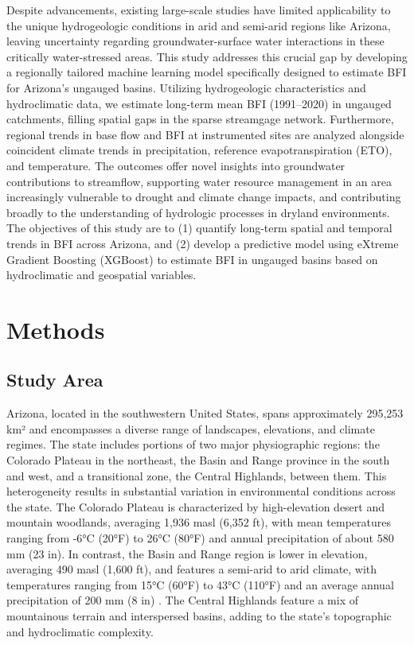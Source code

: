 \documentclass[
  authoryear,
  preprint,
  1p,
  onecolumn]{elsarticle}
\begin{document}
Despite advancements, existing large-scale studies have limited
applicability to the unique hydrogeologic conditions in arid and
semi-arid regions like Arizona, leaving uncertainty regarding
groundwater-surface water interactions in these critically
water-stressed areas. This study addresses this crucial gap by
developing a regionally tailored machine learning model specifically
designed to estimate BFI for Arizona's ungauged basins. Utilizing
hydrogeologic characteristics and hydroclimatic data, we estimate
long-term mean BFI (1991--2020) in ungauged catchments, filling spatial
gaps in the sparse streamgage network. Furthermore, regional trends in
base flow and BFI at instrumented sites are analyzed alongside
coincident climate trends in precipitation, reference evapotranspiration
(ETO), and temperature. The outcomes offer novel insights into
groundwater contributions to streamflow, supporting water resource
management in an area increasingly vulnerable to drought and climate
change impacts, and contributing broadly to the understanding of
hydrologic processes in dryland environments. The objectives of this
study are to (1) quantify long-term spatial and temporal trends in BFI
across Arizona, and (2) develop a predictive model using eXtreme
Gradient Boosting (XGBoost) to estimate BFI in ungauged basins based on
hydroclimatic and geospatial variables.

\section{Methods}\label{sec-methods}

\subsection{Study Area}\label{sec-study-area}

Arizona, located in the southwestern United States, spans approximately
295,253 km² and encompasses a diverse range of landscapes, elevations,
and climate regimes. The state includes portions of two major
physiographic regions: the Colorado Plateau in the northeast, the Basin
and Range province in the south and west, and a transitional zone, the
Central Highlands, between them. This heterogeneity results in
substantial variation in environmental conditions across the state. The
Colorado Plateau is characterized by high-elevation desert and mountain
woodlands, averaging 1,936 masl (6,352 ft), with mean temperatures
ranging from -6°C (20°F) to 26°C (80°F) and annual precipitation of
about 580 mm (23 in). In contrast, the Basin and Range region is lower
in elevation, averaging 490 masl (1,600 ft), and features a semi-arid to
arid climate, with temperatures ranging from 15°C (60°F) to 43°C (110°F)
and an average annual precipitation of 200 mm (8 in)
\citep{az_climate2024}. The Central Highlands feature a mix of
mountainous terrain and interspersed basins, adding to the state's
topographic and hydroclimatic complexity.
\end{document}

